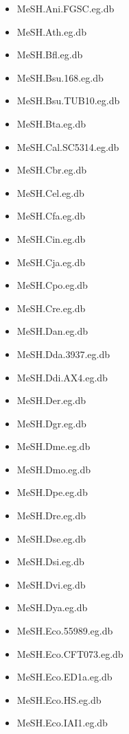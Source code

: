 \documentclass[margin,line,10pt]{res}
\newenvironment{list1}{
  \begin{list}{\ding{113}}{%
      \setlength{\itemsep}{0in}
      \setlength{\parsep}{0in} \setlength{\parskip}{0in}
      \setlength{\topsep}{0in} \setlength{\partopsep}{0in} 
      \setlength{\leftmargin}{0.17in}}}{\end{list}}
\begin{document}
\begin{resume}
\begin{list1}
\begin{multicols}{2}
\begin{itemize}
\item MeSH.Ani.FGSC.eg.db
\item MeSH.Ath.eg.db
\item MeSH.Bfl.eg.db
\item MeSH.Bsu.168.eg.db
\item MeSH.Bsu.TUB10.eg.db
\item MeSH.Bta.eg.db 
\item MeSH.Cal.SC5314.eg.db
\item MeSH.Cbr.eg.db 
\item MeSH.Cel.eg.db
\item MeSH.Cfa.eg.db
\item MeSH.Cin.eg.db
\item MeSH.Cja.eg.db
\item MeSH.Cpo.eg.db
\item MeSH.Cre.eg.db  
\item MeSH.Dan.eg.db
\item MeSH.Dda.3937.eg.db
\item MeSH.Ddi.AX4.eg.db
\item MeSH.Der.eg.db 
\item MeSH.Dgr.eg.db 
\item MeSH.Dme.eg.db 
\item MeSH.Dmo.eg.db 
\item MeSH.Dpe.eg.db
\item MeSH.Dre.eg.db
\item MeSH.Dse.eg.db
\item MeSH.Dsi.eg.db
\item MeSH.Dvi.eg.db  
\item MeSH.Dya.eg.db
\item MeSH.Eco.55989.eg.db
\item MeSH.Eco.CFT073.eg.db
\item MeSH.Eco.ED1a.eg.db 
\item MeSH.Eco.HS.eg.db
\item MeSH.Eco.IAI1.eg.db 

\end{itemize}
\end{multicols}
\end{list1}
\end{resume}
\end{document}
